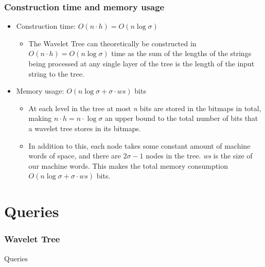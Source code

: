 \documentclass{beamer}
\begin{document}
\begin{frame}
\frametitle{Construction time and memory usage}
\begin{itemize}
\item Construction time: $O(n \cdot h) = O(n \log \sigma)$
	\begin{itemize}
	\item The Wavelet Tree can theoretically be constructed in $O(n \cdot h) = O(n \log \sigma)$ time as the sum of the lengths of the strings being processed at any single layer of the tree is the length of the input string to the tree.
	\end{itemize}
\item Memory usage: $O(n \log \sigma + \sigma \cdot \mathit{ws})$ bits
	\begin{itemize}
	\item At each level in the tree at most \textit{n} bits are stored in the bitmaps in total, making $n \cdot h = n \cdot \log \sigma$ an upper bound to the total number of bits that a wavelet tree stores in its bitmaps.
\item In addition to this, each node takes some constant amount of machine words of space, and there are $2 \sigma -1$ nodes in the tree.
\textit{ws} is the size of our machine words.
This makes the total memory consumption $O(n \log \sigma + \sigma \cdot \mathit{ws})$ bits.
	\end{itemize}
\end{itemize}
\end{frame}

\section{Queries}

\begin{frame}
\frametitle{Wavelet Tree}
\begin{center} \Huge{Queries} \end{center}
\end{frame}
\end{document}
